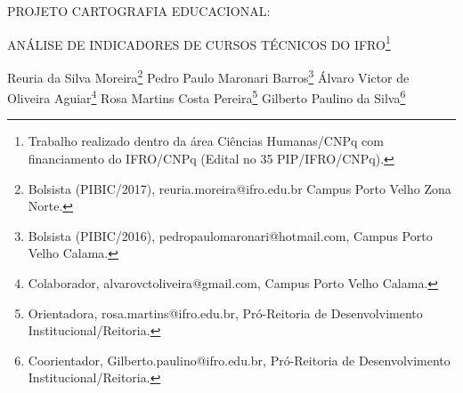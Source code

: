 \documentclass[article,12pt,onesidea,4paper,english,brazil]{abntex2}
\begin{document}
	
	
	\frenchspacing 
	
	\begin{center}
		\LARGE PROJETO CARTOGRAFIA EDUCACIONAL:
		
		ANÁLISE DE INDICADORES DE CURSOS TÉCNICOS DO IFRO\footnote{Trabalho realizado dentro da área Ciências Humanas/CNPq com financiamento do IFRO/CNPq
			(Edital no 35 PIP/IFRO/CNPq).}
		
		\normalsize
		Reuria da Silva Moreira\footnote{Bolsista (PIBIC/2017), reuria.moreira@ifro.edu.br Campus Porto Velho Zona Norte.} 
		Pedro Paulo Maronari Barros\footnote{Bolsista (PIBIC/2016), pedropaulomaronari@hotmail.com, Campus Porto Velho Calama.} 
		Álvaro Victor de Oliveira Aguiar\footnote{Colaborador, alvarovctoliveira@gmail.com, Campus Porto Velho Calama.} 
		Rosa Martins Costa Pereira\footnote{Orientadora, rosa.martins@ifro.edu.br, Pró-Reitoria de Desenvolvimento Institucional/Reitoria.}
		Gilberto Paulino da Silva\footnote{Coorientador, Gilberto.paulino@ifro.edu.br, Pró-Reitoria de Desenvolvimento Institucional/Reitoria.} 
	\end{center}
	
\end{document}
